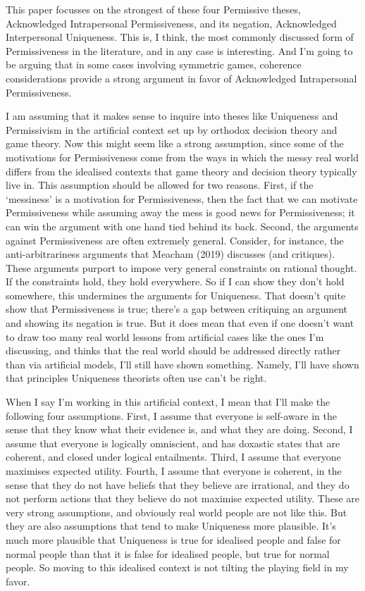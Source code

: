 \documentclass[
  11pt,
]{article}
\begin{document}
This paper focusses on the strongest of these four Permissive theses, Acknowledged Intrapersonal Permissiveness, and its negation, Acknowledged Interpersonal Uniqueness. This is, I think, the most commonly discussed form of Permissiveness in the literature, and in any case is interesting. And I'm going to be arguing that in some cases involving symmetric games, coherence considerations provide a strong argument in favor of Acknowledged Intrapersonal Permissiveness.

I am assuming that it makes sense to inquire into theses like Uniqueness and Permissivism in the artificial context set up by orthodox decision theory and game theory. Now this might seem like a strong assumption, since some of the motivations for Permissiveness come from the ways in which the messy real world differs from the idealised contexts that game theory and decision theory typically live in. This assumption should be allowed for two reasons. First, if the `messiness' is a motivation for Permissiveness, then the fact that we can motivate Permissiveness while assuming away the mess is good news for Permissiveness; it can win the argument with one hand tied behind its back. Second, the arguments against Permissiveness are often extremely general. Consider, for instance, the anti-arbitrariness arguments that Meacham (2019) discusses (and critiques). These arguments purport to impose very general constraints on rational thought. If the constraints hold, they hold everywhere. So if I can show they don't hold somewhere, this undermines the arguments for Uniqueness. That doesn't quite show that Permissiveness is true; there's a gap between critiquing an argument and showing its negation is true. But it does mean that even if one doesn't want to draw too many real world lessons from artificial cases like the ones I'm discussing, and thinks that the real world should be addressed directly rather than via artificial models, I'll still have shown something. Namely, I'll have shown that principles Uniqueness theorists often use can't be right.

When I say I'm working in this artificial context, I mean that I'll make the following four assumptions. First, I assume that everyone is self-aware in the sense that they know what their evidence is, and what they are doing. Second, I assume that everyone is logically omniscient, and has doxastic states that are coherent, and closed under logical entailments. Third, I assume that everyone maximises expected utility. Fourth, I assume that everyone is coherent, in the sense that they do not have beliefs that they believe are irrational, and they do not perform actions that they believe do not maximise expected utility. These are very strong assumptions, and obviously real world people are not like this. But they are also assumptions that tend to make Uniqueness more plausible. It's much more plausible that Uniqueness is true for idealised people and false for normal people than that it is false for idealised people, but true for normal people. So moving to this idealised context is not tilting the playing field in my favor.
\end{document}
